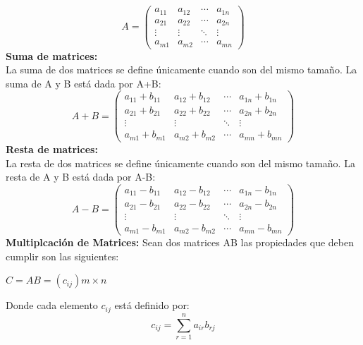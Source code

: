 \documentclass[letter]{revtex4}
\begin{document}
  
   $$ A=
       \begin{pmatrix}
        a_{11} & a_{12} & \cdots & a_{1n}\\
        a_{21} & a_{22} & \cdots & a_{2n}\\
        \vdots & \vdots & \ddots & \vdots\\
        a_{m1} & a_{m2} & \cdots & a_{mn}
    \end{pmatrix}
    $$
\textbf{Suma de matrices: }\\
La suma de dos matrices se define únicamente cuando son del mismo tamaño. La suma de A y B está dada por A+B: 
   $$ A+B=
       \begin{pmatrix}
        a_{11}+b_{11} & a_{12}+b_{12} & \cdots & a_{1n}+b_{1n}\\
        a_{21}+b_{21} & a_{22}+b_{22} & \cdots & a_{2n}+b_{2n}\\
        \vdots & \vdots & \ddots & \vdots\\
        a_{m1}+b_{m1} & a_{m2}+b_{m2} & \cdots & a_{mn}+b_{mn}
    \end{pmatrix}
    $$
\textbf{Resta de matrices: }\\
La resta de dos matrices se define únicamente cuando son del mismo tamaño. La resta de A y B está dada por A-B: 
   $$ A-B=
       \begin{pmatrix}
        a_{11}-b_{11} & a_{12}-b_{12} & \cdots & a_{1n}-b_{1n}\\
        a_{21}-b_{21} & a_{22}-b_{22} & \cdots & a_{2n}-b_{2n}\\
        \vdots & \vdots & \ddots & \vdots\\
        a_{m1}-b_{m1} & a_{m2}-b_{m2} & \cdots & a_{mn}-b_{mn}
    \end{pmatrix}
    $$
\textbf{Multiplcación de Matrices: }
Sean dos matrices AB las propiedades que deben cumplir son las siguientes: 

    $ 
        C=AB=(c_{ij})m \times n
    $
    
    Donde cada elemento $c_{ij}$ está definido por: 
   $$c_{ij}=\sum_{r=1}^{n} a_{ir}b_{rj}$$
    
\end{document}
